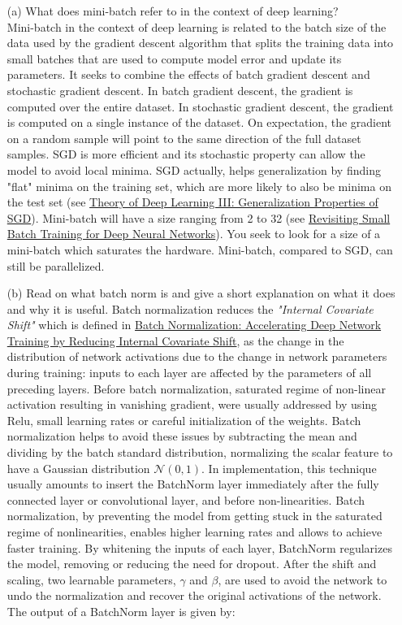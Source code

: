 \documentclass[11pt]{article}
\newcommand{\0}{\mat{0}}
\begin{document}
\begin{itemize}
    \item[(a)]   What does mini-batch refer to in the context of deep learning?\\
    Mini-batch in the context of deep learning is related to the batch size of the data used by the gradient descent algorithm that splits the training
    data into small batches that are used to compute model error and update its parameters. It seeks to combine the effects of batch gradient descent and stochastic gradient descent.
    In batch gradient descent, the gradient is computed over the entire dataset. In stochastic gradient descent, the gradient is computed on a single instance of the dataset. On expectation, the gradient on a random sample will point to the same direction of the full dataset samples. SGD is more efficient and its stochastic property  can allow the model to avoid local minima.  SGD actually, helps generalization by finding "flat" minima on the training set, which are more likely to also be minima on the test set (see \href{https://cbmm.mit.edu/sites/default/files/publications/CBMM-Memo-067.pdf}{Theory of Deep Learning III: Generalization Properties of SGD}). Mini-batch will have a size ranging from 2 to 32 (see \href{https://arxiv.org/abs/1804.07612}{Revisiting Small Batch Training for Deep Neural Networks}). You seek to look for a size of a mini-batch which saturates the hardware. Mini-batch, compared to SGD, can still be parallelized. 
    \item[(b)] Read on what batch norm is and give a short explanation on what it does and why it is useful.
    Batch normalization reduces the \textit{"Internal Covariate Shift"} which is defined in \href{https://arxiv.org/abs/1502.03167}{Batch Normalization: Accelerating Deep Network Training by Reducing Internal Covariate Shift}, as the change in the distribution of network activations due to the change in network parameters during training: inputs to each layer are affected by the parameters of all preceding layers. Before batch normalization, saturated regime of non-linear activation resulting in vanishing gradient, were usually addressed by using Relu, small learning rates or careful initialization of the weights. Batch normalization helps to avoid these issues by subtracting the mean and dividing by the batch standard distribution, normalizing the scalar feature to have a Gaussian distribution $\mathcal{N}(0,1)$.  In implementation, this technique usually amounts to insert the BatchNorm layer immediately after the fully connected layer or convolutional layer, and before non-linearities. Batch normalization, by preventing the model from getting stuck in the saturated regime of nonlinearities, enables higher learning rates and allows to achieve faster training. By whitening the inputs of  each layer, BatchNorm regularizes the model, removing or reducing the need for dropout. After the shift and scaling, two learnable parameters, $\gamma$ and $\beta$, are used to avoid the network to undo the normalization and recover the original activations  of the network. The output of a BatchNorm layer is given by:

\end{itemize}
\end{document}
